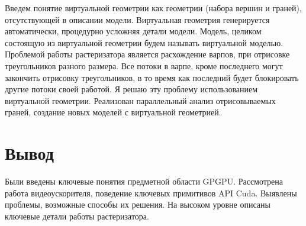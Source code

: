 Введем понятие виртуальной геометрии как геометрии (набора вершин и граней), отсутствующей в описании модели. 
Виртуальная геометрия генерируется автоматически, процедурно усложняя детали модели. Модель, целиком состоящую из виртуальной геометрии будем называть виртуальной моделью.
Проблемой работы растеризатора является расхождение варпов, при отрисовке треугольников разного размера. Все потоки в варпе, кроме последнего могут закончить отрисовку треугольников, в то время как последний будет блокировать другие потоки своей работой.
Я решаю эту проблему использованием виртуальной геометрии.
Реализован параллельный анализ отрисовываемых граней, создание новых моделей с виртуальной геометрией.

\section*{Вывод}

Были введены ключевые понятия предметной области GPGPU. Рассмотрена работа видеоускорителя, поведение ключевых примитивов API Cuda.
Выявлены проблемы, возможные способы их решения. На высоком уровне описаны ключевые детали работы растеризатора.